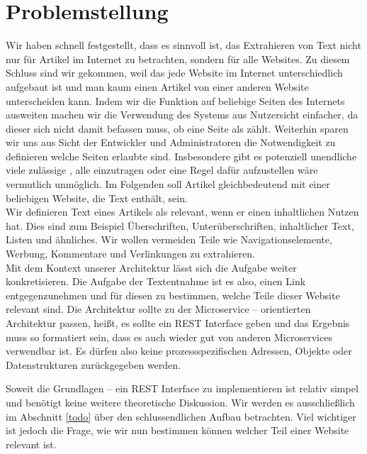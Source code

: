\section{Problemstellung}
Wir haben schnell festgestellt, dass es sinnvoll ist, das Extrahieren von Text nicht nur für Artikel im Internet zu betrachten, sondern für alle Websites. Zu diesem Schluss sind wir gekommen, weil das jede Website im Internet unterschiedlich aufgebaut ist und man kaum einen Artikel von einer anderen Website unterscheiden kann. Indem wir die Funktion auf beliebige Seiten des Internets ausweiten machen wir die Verwendung des Systems aus Nutzersicht einfacher, da dieser sich nicht damit befassen muss, ob eine Seite als  zählt. Weiterhin sparen wir uns aus Sicht der Entwickler und Administratoren die Notwendigkeit zu definieren welche Seiten erlaubte  sind. Insbesondere gibt es potenziell unendliche viele zulässige , alle einzutragen oder eine Regel dafür aufzustellen wäre vermutlich unmöglich.
Im Folgenden soll Artikel gleichbedeutend mit einer beliebigen Website, die Text enthält, sein.\\
Wir definieren Text eines Artikels als relevant, wenn er einen inhaltlichen Nutzen hat. Dies sind zum Beispiel Überschriften, Unterüberschriften, inhaltlicher Text, Listen und ähnliches. Wir wollen vermeiden Teile wie Navigationselemente, Werbung, Kommentare und Verlinkungen zu extrahieren. \\
Mit dem Kontext unserer Architektur lässt sich die Aufgabe weiter konkretisieren. Die Aufgabe der Textentnahme ist es also, einen Link entgegenzunehmen und für diesen zu bestimmen, welche Teile dieser Website relevant sind. Die Architektur sollte zu der Microservice – orientierten Architektur passen, heißt, es sollte ein REST Interface geben und das Ergebnis muss so formatiert sein, dass es auch wieder gut von anderen Microservices verwendbar ist. Es dürfen also keine prozessspezifischen Adressen, Objekte oder Datenstrukturen zurückgegeben werden. \\ \par
Soweit die Grundlagen – ein REST Interface zu implementieren ist relativ simpel und benötigt keine weitere theoretische Diskussion. Wir werden es ausschließlich im Abschnitt \ref{todo} über den schlussendlichen Aufbau betrachten. Viel wichtiger ist jedoch die Frage, wie wir nun bestimmen können welcher Teil einer Website relevant ist. 

